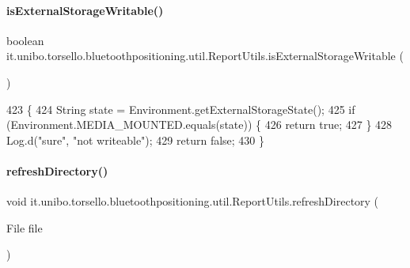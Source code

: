 \paragraph{\texorpdfstring{is\+External\+Storage\+Writable()}{isExternalStorageWritable()}}
{\footnotesize\ttfamily boolean it.\+unibo.\+torsello.\+bluetoothpositioning.\+util.\+Report\+Utils.\+is\+External\+Storage\+Writable (\begin{DoxyParamCaption}{ }\end{DoxyParamCaption})\hspace{0.3cm}{\ttfamily [private]}}


\begin{DoxyCode}
423                                                 \{
424         String state = Environment.getExternalStorageState();
425         \textcolor{keywordflow}{if} (Environment.MEDIA\_MOUNTED.equals(state)) \{
426             \textcolor{keywordflow}{return} \textcolor{keyword}{true};
427         \}
428         Log.d(\textcolor{stringliteral}{"sure"}, \textcolor{stringliteral}{"not writeable"});
429         \textcolor{keywordflow}{return} \textcolor{keyword}{false};
430     \}
\end{DoxyCode}
\hypertarget{classit_1_1unibo_1_1torsello_1_1bluetoothpositioning_1_1util_1_1ReportUtils_a5d2a51b68c3344f5aa41abaa118282b4_a5d2a51b68c3344f5aa41abaa118282b4}{}\label{classit_1_1unibo_1_1torsello_1_1bluetoothpositioning_1_1util_1_1ReportUtils_a5d2a51b68c3344f5aa41abaa118282b4_a5d2a51b68c3344f5aa41abaa118282b4} 
\paragraph{\texorpdfstring{refresh\+Directory()}{refreshDirectory()}}
{\footnotesize\ttfamily void it.\+unibo.\+torsello.\+bluetoothpositioning.\+util.\+Report\+Utils.\+refresh\+Directory (\begin{DoxyParamCaption}\item[{File}]{file }\end{DoxyParamCaption})\hspace{0.3cm}{\ttfamily [private]}}


